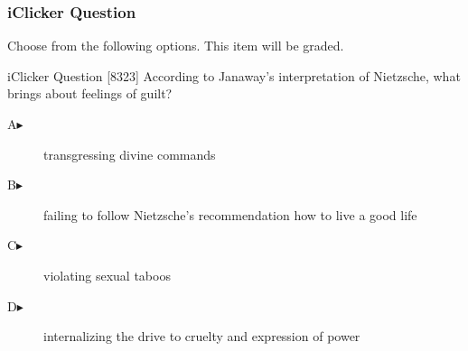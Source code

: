 \begin{frame}
  \frametitle{iClicker Question}
Choose from the following options. This item will be graded.
\begin{block}{iClicker Question}
[8323] According to Janaway's interpretation of Nietzsche, what brings about feelings of guilt?
\end{block}
\begin{description}
\item[A\hspace{.2in}$\blacktriangleright$] transgressing divine commands
\item[B\hspace{.2in}$\blacktriangleright$] failing to follow Nietzsche's recommendation how to live a good life
\item[C\hspace{.2in}$\blacktriangleright$] violating sexual taboos
\item[D\hspace{.2in}$\blacktriangleright$] internalizing the drive to cruelty and expression of power
\end{description}
\end{frame}